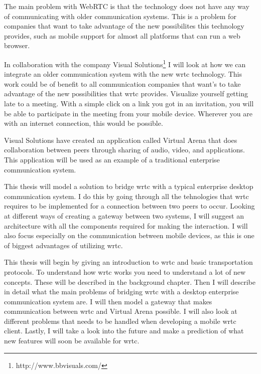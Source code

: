 The main problem with WebRTC is that the technology does not have any way of communicating with older communication systems. This is a problem for companies that want to take advantage of the new possibilites this technology provides, such as mobile support for almost all platforms that can run a web browser.

In collaboration with the company Visual Solutions\footnote{http://www.bbvisuals.com/} I will look at how we can integrate an older communication system with the new \gls{wrtc} technology. This work could be of benefit to all communication companies that want's to take advantage of the new possibilities that \gls{wrtc} provides. Visualize yourself getting late to a meeting. With a simple click on a link you got in an invitation, you will be able to participate in the meeting from your mobile device. Wherever you are with an internet connection, this would be possible.

Visual Solutions have created an application called Virtual Arena that does collaboration between peers through sharing of audio, video, and applications. This application will be used as an example of a traditional enterprise communication system.

This thesis will model a solution to bridge \gls{wrtc} with a typical enterprise desktop communication system. I do this by going through all the tehnologies that \gls{wrtc} requires to be implemented for a connection between two peers to occur. Looking at different ways of creating a gateway between two systems, I will suggest an architecture with all the components required for making the interaction. I will also focus especially on the communication between mobile devices, as this is one of biggest advantages of utilizing \gls{wrtc}.

This thesis will begin by giving an introduction to \gls{wrtc} and basic transportation protocols. To understand how \gls{wrtc} works you need to understand a lot of new concepts. These will be described in the background chapter. Then I will describe in detail what the main problems of bridging \gls{wrtc} with a desktop enterprise communication system are. I will then model a gateway that makes communication between \gls{wrtc} and Virtual Arena possible. I will also look at different problems that needs to be handled when developing a mobile \gls{wrtc} client. Lastly, I will take a look into the future and make a prediction of what new features will soon be available for \gls{wrtc}.